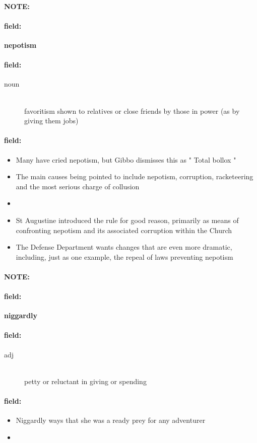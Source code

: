 \documentclass[12pt]{article}
\newenvironment{note}{\paragraph{NOTE:}}{}
\newenvironment{field}{\paragraph{field:}}{}
\begin{document}
\begin{note}
\begin{field}
\textbf{\large nepotism}
\end{field}


\begin{field}
\begin{description}
\item[noun] \hfill \\ 
favoritism shown to relatives or close friends by those in power (as by giving them jobs)

\end{description}
\end{field}

\begin{field}
\begin{itemize}
\item Many have cried nepotism, but Gibbo dismisses this as " Total bollox " 
\item The main causes being pointed to include nepotism, corruption, racketeering and the most serious charge of collusion
\item 
\item St Augustine introduced the rule for good reason, primarily as means of confronting nepotism and its associated corruption within the Church
\item The Defense Department wants changes that are even more dramatic, including, just as one example, the repeal of laws preventing nepotism
\end{itemize}
\end{field}
\end{note}
\begin{note}
\begin{field}
\textbf{\large niggardly}
\end{field}


\begin{field}
\begin{description}
\item[adj] \hfill \\ 
petty or reluctant in giving or spending

\end{description}
\end{field}

\begin{field}
\begin{itemize}
\item Niggardly ways that she was a ready prey for any adventurer
\item 
\end{itemize}
\end{field}
\end{note}
\end{document}
